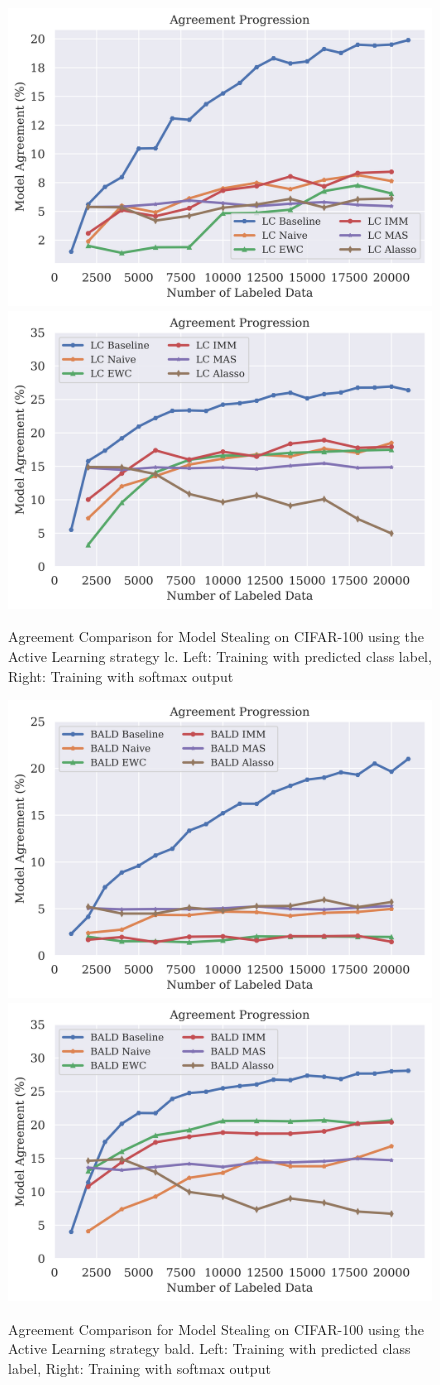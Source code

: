 \begin{figure}[!htb]
    \centering
    \includegraphics[width=0.48\linewidth]{images/results_CALMS/cifar100_label_lc.png} \hfill
    \includegraphics[width=0.48\linewidth]{images/results_CALMS/cifar100_softmax_lc.png}
    \caption{Agreement Comparison for Model Stealing on CIFAR-100 using the Active Learning strategy \gls{lc}. Left: Training with predicted class label,
    Right: Training with softmax output}
    \label{fig:CALMSCIFAR100LC}
\end{figure}

\begin{figure}[!htb]
    \centering
    \includegraphics[width=0.48\linewidth]{images/results_CALMS/cifar100_label_bald.png} \hfill
    \includegraphics[width=0.48\linewidth]{images/results_CALMS/cifar100_softmax_bald.png}
    \caption{Agreement Comparison for Model Stealing on CIFAR-100 using the Active Learning strategy \gls{bald}. Left: Training with predicted class label,
    Right: Training with softmax output}
    \label{fig:CALMSCIFAR100BALD}
\end{figure}

